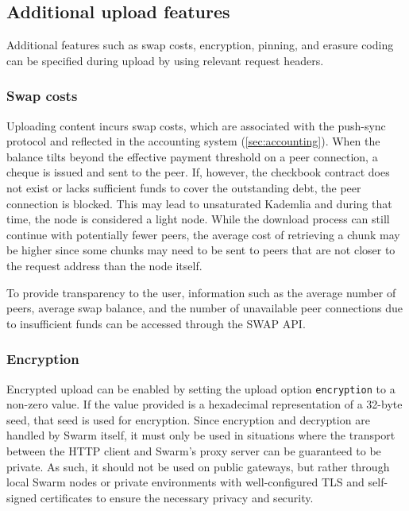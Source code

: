 \subsection{Additional upload features \statusgreen}\label{sec:features}

Additional features such as swap costs, encryption, pinning, and erasure coding can be specified during upload by using relevant request headers. 


\subsubsection{Swap costs}

Uploading content incurs swap costs, which are associated with the push-sync protocol and reflected in the  accounting system (\ref{sec:accounting}). When the balance tilts beyond the effective payment threshold on a peer connection, a cheque is issued and sent to the peer. If, however, the checkbook contract does not exist or lacks sufficient funds to cover the outstanding debt, the peer connection is blocked. This may lead to unsaturated Kademlia and during that time, the node is considered a light node. While the download process can still continue with potentially fewer peers, the average cost of retrieving a chunk may be higher since some chunks may need to be sent to peers that are not closer to the request address than the node itself. 

To provide transparency to the user, information such as the average number of peers, average swap balance, and the number of unavailable peer connections due to insufficient funds can be accessed through the SWAP API.

\subsubsection{Encryption}

Encrypted upload can be enabled by setting the upload option \lstinline{encryption} to a non-zero value. If the value provided is a hexadecimal representation of a 32-byte seed, that seed is used for encryption. Since encryption and decryption are handled by Swarm itself, it must only be used in situations where the transport between the HTTP client and Swarm's proxy server can be guaranteed to be private. As such, it should not be used on public gateways, but rather through local Swarm nodes or private environments with well-configured TLS and self-signed certificates to ensure the necessary privacy and security.

